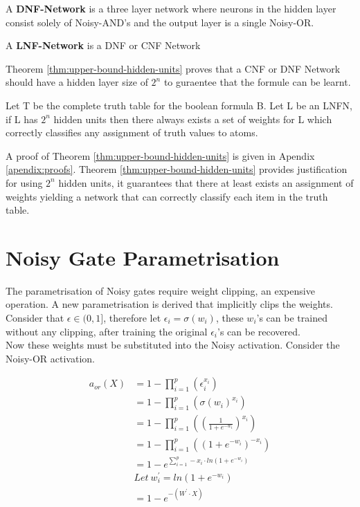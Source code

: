 \theoremstyle{definition}
\begin{definition} \label{def:dnf-network}
A \textbf{DNF-Network} is a three layer network where neurons in the hidden layer consist solely of Noisy-AND's and the output layer is a single Noisy-OR. 
\end{definition}

\theoremstyle{definition}
\begin{definition} \label{def:lnfn}
A \textbf{LNF-Network} is a DNF or CNF Network
\end{definition}

Theorem \ref{thm:upper-bound-hidden-units} proves that a CNF or DNF Network should have a hidden layer size of $2^n$ to guraentee that the formule can be learnt.

\begin{theorem}
Let T be the complete truth table for the boolean formula B. Let L be an LNFN, if L has $2^n$ hidden units then there always exists a set of weights for L which correctly classifies any assignment of truth values to atoms.
\label{thm:upper-bound-hidden-units}
\end{theorem}

A proof of Theorem \ref{thm:upper-bound-hidden-units} is given in Apendix \ref{apendix:proofs}. Theorem \ref{thm:upper-bound-hidden-units} provides justification for using $2^n$ hidden units, it guarantees that there at least exists an assignment of weights yielding a network that can correctly classify each item in the truth table.

\section{Noisy Gate Parametrisation} \label{sec:real-noisy-parametrisation}
The parametrisation of Noisy gates require weight clipping, an expensive operation. A new parametrisation is derived that implicitly clips the weights. Consider that $\epsilon \in (0, 1]$, therefore let $\epsilon_i = \sigma(w_i)$, these $w_i$'s can be trained without any clipping, after training the original $\epsilon_i$'s can be recovered.\\

Now these weights must be substituted into the Noisy activation. Consider the Noisy-OR activation.

\begin{align*}
a_{or}(X) &= 1 - \prod^p_{i=1}(\epsilon_i^{x_i})\\
&= 1 - \prod^p_{i=1}(\sigma(w_i)^{x_i})\\
&= 1 - \prod^p_{i=1}((\frac{1}{1 + e^{-w_i}})^{x_i})\\
&= 1 - \prod^p_{i=1}((1 + e^{-w_i})^{-x_i})\\
&= 1 - e^{\sum^p_{i=1} -x_i \cdot ln(1 + e^{-w_i})} \\
&Let\ w_i^{'} = ln(1 + e^{-w_i})\\
&= 1 - e^{-(W^{'} \cdot X)}
\end{align*}

